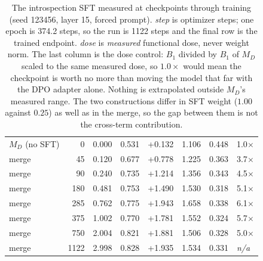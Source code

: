 \begin{table}[h]
\begin{tabular}{lrrrrrrl}
$M_D$ (no SFT) & 0 & 0.000 & 0.531 & +0.132 & 1.106 & 0.448 & 1.0$\times$ \\
merge & 45 & 0.120 & 0.677 & +0.778 & 1.225 & 0.363 & 3.7$\times$ \\
merge & 90 & 0.240 & 0.735 & +1.214 & 1.356 & 0.343 & 4.5$\times$ \\
merge & 180 & 0.481 & 0.753 & +1.490 & 1.530 & 0.318 & 5.1$\times$ \\
merge & 285 & 0.762 & 0.775 & +1.943 & 1.658 & 0.338 & 6.1$\times$ \\
merge & 375 & 1.002 & 0.770 & +1.781 & 1.552 & 0.324 & 5.7$\times$ \\
merge & 750 & 2.004 & 0.821 & +1.881 & 1.506 & 0.328 & 5.0$\times$ \\
merge & 1122 & 2.998 & 0.828 & +1.935 & 1.534 & 0.331 & \textit{n/a} \\
\bottomrule
\end{tabular}
\caption{The introspection SFT measured at checkpoints through training (seed 123456, layer 15, forced prompt). \emph{step} is optimizer steps; one epoch is 374.2 steps, so the run is 1122 steps and the final row is the trained endpoint. \emph{dose} is \emph{measured} functional dose, never weight norm. The last column is the dose control: $B_1$ divided by $B_1$ of $M_D$ scaled to the same measured dose, so $1.0\times$ would mean the checkpoint is worth no more than moving the model that far with the DPO adapter alone. Nothing is extrapolated outside $M_D$'s measured range. The two constructions differ in SFT weight ($1.00$ against $0.25$) as well as in the merge, so the gap between them is not the cross-term contribution.}
\label{tab:oct-sft-curve}
\end{table}
